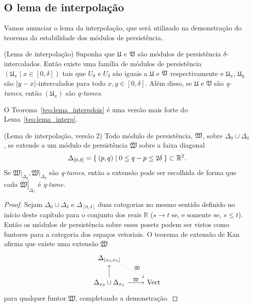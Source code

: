\subsection{O lema de interpolação}

Vamos anunciar o lema da interpolação, que será utilizado na 
demonstração do teorema da estabilidade dos módulos de persistência.

\begin{lem}{(Lema de interpolação)}\label{teo:lema_interp}
Suponha que $\mathfrak{U}$ e $\mathfrak{V}$ são módulos de persistência
$\delta$-intercalados. Então existe uma família de módulos de 
persistência $(\mathfrak{U}_x \mid x \in [0,\delta])$ tais que 
$U_0$ e $U_\delta$ são iguais a $\mathfrak{U}$ e $\mathfrak{V}$ 
respectivamente e $\mathfrak{U}_x$, $\mathfrak{U}_y$ são 
$\left\lvert y-x\right\rvert$-intercalados para todo $x,y \in [0,\delta]$. Além disso,
se $\mathfrak{U}$ e $\mathfrak{V}$ são \textit{q-tames}, então 
$(\mathfrak{U}_x)$ são \textit{q-tames}.
\end{lem}

O Teorema~\ref{teo:lema_interpdois} é uma versão mais forte do 
Lema~\ref{teo:lema_interp}. 
\begin{teo}{(Lema de interpolação, versão 2)}\label{teo:lema_interpdois}
Todo módulo de persistência, $\mathfrak{W}$, sobre $\Delta_0 \cup 
\Delta_\delta$, se extende a um módulo de persistência 
$\bar{\mathfrak{W}}$ sobre a faixa diagonal
\begin{equation*}
    \Delta_{[0, \delta]} = \Set{(p,q) | 0 \leq q - p \leq 2\delta}
    \subset \mathbb{R}^2.
\end{equation*} 
Se $\left.\mathfrak{W}\right|_{\Delta_0}, \left.\mathfrak{W}
\right|_{\Delta_\delta}$ são \textit{q-tames}, então a extensão
pode ser escolhida de forma que cada $\left.\bar{\mathfrak{W}}
\right|_{\Delta_x}$ é \textit{q-tame}. 
\end{teo}
\begin{proof}
    Sejam $\Delta_0 \cup \Delta_\delta$ e $\Delta_{[0,\delta]}$ duas 
    categorias no mesmo sentido definido no início deste capítulo para
    o conjunto dos reais $\mathbb{R}$ ($s \to t \text{ se, e somente se,  } s \leq t$).
    Então os módulos de persistência sobre esses posets podem ser vistos
    como funtores para a categoria dos espaços vetoriais. O teorema
    de extensão de Kan~\cite{MacLane1978} afirma que existe uma extensão
    $\bar{\mathfrak{W}}$ 
    \begin{equation*}
        \begin{tikzcd}
            {\Delta_{[x_0,x_1]}} \arrow[dotted]{rd}{\bar{\mathfrak{W}}}     &             \\
            \Delta_{x_0} \cup \Delta_{x_1} \arrow{u} \arrow{r}{\mathfrak{W}}  & \text{Vect}
        \end{tikzcd}
    \end{equation*}
    para qualquer funtor $\mathfrak{W}$, completando
    a demonstração. 
\end{proof}

